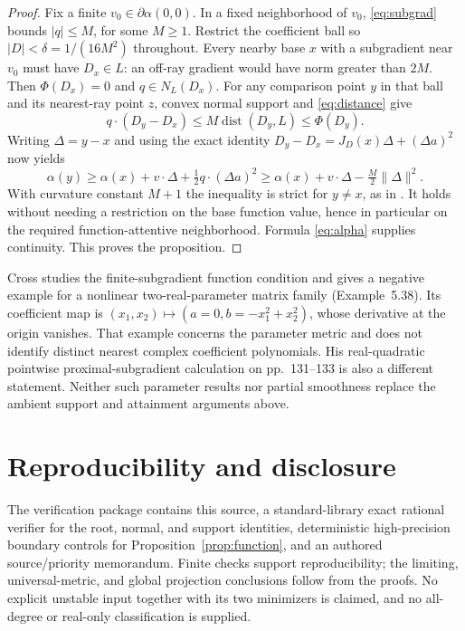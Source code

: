 \documentclass[11pt]{article}
\theoremstyle{remark}\newtheorem{remark}[theorem]{Remark}
\newcommand{\norm}[1]{\lVert #1\rVert}
\newcommand{\dist}{\operatorname{dist}}
\begin{document}
\begin{proof}
Fix a finite $v_0\in\partial\alpha(0,0)$. In a fixed neighborhood of $v_0$,
\eqref{eq:subgrad} bounds $|q|\leq M$, for some $M\geq1$.
Restrict the coefficient ball so $|D|<\delta=1/(16M^2)$ throughout.
Every nearby base $x$ with a subgradient near $v_0$ must have $D_x\in L$:
an off-ray gradient would have norm greater than $2M$.
Then $\Phi(D_x)=0$ and $q\in N_L(D_x)$.
For any comparison point $y$ in that ball and its nearest-ray point $z$,
convex normal support and \eqref{eq:distance} give
\[
 q\mathbin{\cdot}(D_y-D_x)
 \leq M\dist(D_y,L)\leq\Phi(D_y).
\]
Writing $\Delta=y-x$ and using the exact identity
$D_y-D_x=J_D(x)\Delta+(\Delta a)^2$ now yields
\[
 \alpha(y)\geq\alpha(x)+v\mathbin{\cdot}\Delta
       +\tfrac12q\mathbin{\cdot}(\Delta a)^2
 \geq\alpha(x)+v\mathbin{\cdot}\Delta-\tfrac M2\norm\Delta^2.
\]
With curvature constant $M+1$ the inequality is strict for $y\ne x$, as in
\cite[Definition~1.1]{PR}. It holds without needing a restriction on the
base function value, hence in particular on the required function-attentive
neighborhood. Formula \eqref{eq:alpha} supplies continuity. This proves the
proposition.
\end{proof}

Cross \cite[Chapter~5]{Cross} studies the finite-subgradient function
condition and gives a negative example for a nonlinear two-real-parameter
matrix family (Example~5.38). Its coefficient map is
$(x_1,x_2)\mapsto(a=0,b=-x_1^2+x_2^2)$, whose derivative at the origin
vanishes. That example concerns the parameter metric and does not identify
distinct nearest complex coefficient polynomials. His real-quadratic
pointwise proximal-subgradient calculation on pp.~131--133 is also a
different statement. Neither such parameter results nor partial smoothness
replace the ambient support and attainment arguments above.

\section*{Reproducibility and disclosure}
The verification package contains this source, a standard-library exact
rational verifier for the root, normal, and support identities, deterministic
high-precision boundary controls for Proposition~\ref{prop:function}, and
an authored source/priority memorandum. Finite checks support reproducibility;
the limiting, universal-metric, and global projection conclusions follow
from the proofs. No explicit unstable input together with its two minimizers
is claimed, and no all-degree or real-only classification is supplied.
\end{document}
